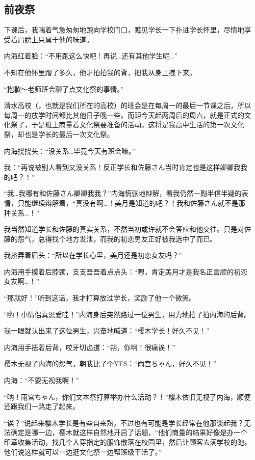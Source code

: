 \subsection{前夜祭}
\newday{\sunny\sunset}


{

}

下课后，我喘着气急匆匆地跑向学校门口，瞧见学长一下扑进学长怀里，尽情地享受着肩膀上只属于他的味道。

内海红着脸：“不用跑这么快吧！再说…还有其他学生呢…”

不知在他怀里蹭了多久，他才拍拍我的背，把我从身上拽下来。

“抱歉～老师班会聊了点文化祭的事情。”

清水高校（，也就是我们所在的高校）的班会是在每周一的最后一节课之后，所以每周一的放学时间都比其他日子晚一些。而距今天起两周后的周六，就是正式的文化祭了，于是班上商量着文化祭要准备的活动。这将是我高中生活的第一次文化祭，却也是学长的最后一次文化祭。

内海挠挠头：“没关系…毕竟今天有班会嘛。”

我：“再说被别人看到又没关系！反正学长和佐藤さん当时肯定也是这样卿卿我我的吧？！”

“我…我哪有和佐藤さん卿卿我我？”内海慌张地辩解，看我仍然一副半信半疑的表情，只能继续辩解着，“真没有啊…！美月是知道的吧？！我和佐藤さん就不是那种关系…！”

我当然知道学长和佐藤的真实关系，不然当初或许就不会答应和他交往。只是对佐藤的怨气，总得找个地方发泄，而我的初恋男友正好被我选中了而已。

我挤弄着眉头：“所以在学长心里，美月还是初恋女友吗？”

内海用手摸着后脖颈，支支吾吾着点点头：“嗯，肯定美月才是我名正言顺的初恋女友啊…！”

“那就好！”听到这话，我才打算放过学长，奖励了他一个微笑。

“哟！小情侣真恩爱哇！”内海身后突然路过一位男生，用力地拍了拍内海的后背。

我一眼就认出来了这位男生，兴奋地喊道：“樱木学长！好久不见！”

内海用手捂着后背，咬牙切齿道：“朔，你啊！很痛诶！”

樱木无视了内海的怨气，朝我比了个YES：“雨宫ちゃん，好久不见！”

内海：“不要无视我啊！”

“呐！雨宫ちゃん，你们文本祭打算举办什么活动？！”樱木依旧无视了内海，顺便还跟我们一路走了起来。

“诶？”说起来樱木学长是有些自来熟，不过也有可能是学长经常在他那谈起我？无法确定是哪一边，樱木就这样自然地开启了话题，“他们商量的结果好像是办一个印章收集活动，找几个人穿指定的服饰散落在校园里，然后让顾客去满学校的跑。他们说这样就可以一边逛文化祭一边帮班级干活了。”

